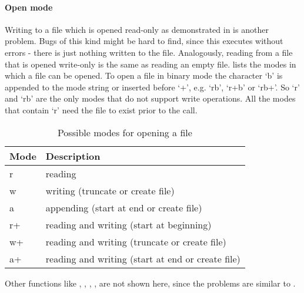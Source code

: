 \paragraph*{Open mode}
Writing to a file which is opened read-only as demonstrated in  is another problem. Bugs of this kind might be hard to find, since this executes without errors - there is just nothing written to the file.
Analogously, reading from a file that is opened write-only is the same as reading an empty file.
 lists the modes in which a file can be opened.
To open a file in binary mode the character `b' is appended to the mode string or inserted before `+', e.g. `rb', `r+b' or `rb+'.
So `r' and `rb' are the only modes that do not support write operations.
All the modes that contain `r' need the file to exist prior to the call.
\begin{table}[ht]
\centering
\begin{tabular}{ll}\hline
Mode & Description\\\hline
r  & reading\\
w  & writing (truncate or create file)\\
a  & appending (start at end or create file)\\
r+ & reading and writing (start at beginning)\\
w+ & reading and writing (truncate or create file)\\
a+ & reading and writing (start at end or create file)
\end{tabular}
\caption{Possible modes for opening a file \cite{ISO:2011:IIIb}}
\label{tbl:open_modes}
\end{table}

Other functions like , , , ,  are not shown here, since the problems are similar to .


